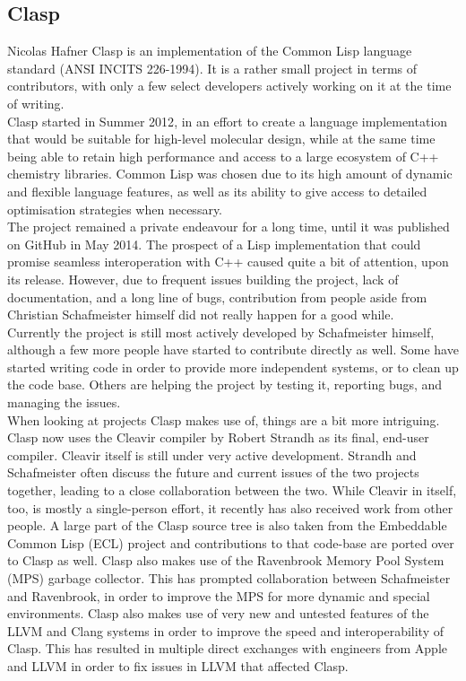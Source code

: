 \subsection{Clasp}{Nicolas Hafner}
Clasp\cite{clasp-github} is an implementation of the Common Lisp language standard (ANSI INCITS 226-1994). It is a rather small project in terms of contributors, with only a few select developers actively working on it at the time of writing. \\

Clasp started in Summer 2012\cite{clasp-timeline}, in an effort to create a language implementation that would be suitable for high-level molecular design, while at the same time being able to retain high performance and access to a large ecosystem of C++ chemistry libraries\cite{clasp-cando}. Common Lisp was chosen due to its high amount of dynamic and flexible language features, as well as its ability to give access to detailed optimisation strategies when necessary\cite{clasp-talk}. \\

The project remained a private endeavour for a long time, until it was published on GitHub in May 2014\cite{clasp-github}. The prospect of a Lisp implementation that could promise seamless interoperation with C++ caused quite a bit of attention, upon its release. However, due to frequent issues building the project, lack of documentation, and a long line of bugs, contribution from people aside from Christian Schafmeister himself did not really happen for a good while. \\

Currently the project is still most actively developed by Schafmeister himself, although a few more people have started to contribute directly as well. Some have started writing code in order to provide more independent systems, or to clean up the code base. Others are helping the project by testing it, reporting bugs, and managing the issues. \\

When looking at projects Clasp makes use of, things are a bit more intriguing. Clasp now uses the Cleavir compiler by Robert Strandh\cite{clasp-cleavir} as its final, end-user compiler. Cleavir itself is still under very active development. Strandh and Schafmeister often discuss the future and current issues of the two projects together, leading to a close collaboration between the two. While Cleavir in itself, too, is mostly a single-person effort, it recently has also received work from other people. A large part of the Clasp source tree is also taken from the Embeddable Common Lisp (ECL)\cite{clasp-ecl} project and contributions to that code-base are ported over to Clasp as well. Clasp also makes use of the Ravenbrook Memory Pool System (MPS)\cite{clasp-mps} garbage collector. This has prompted collaboration between Schafmeister and Ravenbrook, in order to improve the MPS for more dynamic and special environments. Clasp also makes use of very new and untested features of the LLVM and Clang systems in order to improve the speed and interoperability of Clasp. This has resulted in multiple direct exchanges with engineers from Apple and LLVM in order to fix issues in LLVM that affected Clasp. \\

